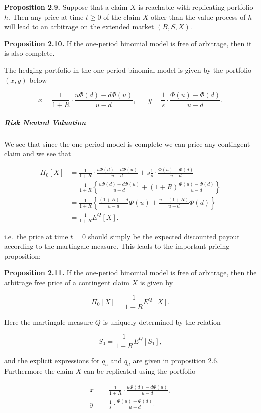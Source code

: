 \documentclass[
]{article}
\begin{document}
\textbf{Proposition 2.9.} Suppose that a claim \(X\) is reachable with
replicating portfolio \(h\). Then any price at time \(t\ge 0\) of the
claim \(X\) other than the value process of \(h\) will lead to an
arbitrage on the extended market \((B,S,X)\).

\textbf{Proposition 2.10.} If the one-period binomial model is free of
arbitrage, then it is also complete.

The hedging portfolio in the one-period binomial model is given by the
portfolio \((x,y)\) below

\[
x=\frac{1}{1+R}\cdot\frac{u\Phi(d)-d\Phi(u)}{u-d},\hspace{20pt}y=\frac{1}{s}\cdot\frac{\Phi(u)-\Phi(d)}{u-d}.
\]

\hypertarget{risk-neutral-valuation}{%
\subparagraph{Risk Neutral Valuation}\label{risk-neutral-valuation}}

We see that since the one-period model is complete we can price any
contingent claim and we see that

\begin{align*}
\Pi_0[X]&=\frac{1}{1+R}\cdot\frac{u\Phi(d)-d\Phi(u)}{u-d}+s\frac{1}{s}\cdot\frac{\Phi(u)-\Phi(d)}{u-d}\\
&=\frac{1}{1+R}\left\{\frac{u\Phi(d)-d\Phi(u)}{u-d}+(1+R)\frac{\Phi(u)-\Phi(d)}{u-d}\right\}\\
&=\frac{1}{1+R}\left\{\frac{(1+R)-d}{u-d}\Phi(u)+\frac{u-(1+R)}{u-d}\Phi(d)\right\}\\
&=\frac{1}{1+R}E^Q[X].
\end{align*}

i.e.~the price at time \(t=0\) should simply be the expected discounted
payout according to the martingale measure. This leads to the important
pricing proposition:

\textbf{Proposition 2.11.} If the one-period binomial model is free of
arbitrage, then the arbitrage free price of a contingent claim \(X\) is
given by

\[
\Pi_0[X]=\frac{1}{1+R}E^Q[X].\tag{2.4}
\]

Here the martingale measure \(Q\) is uniquely determined by the relation

\[
S_0=\frac{1}{1+R}E^Q[S_1],\tag{2.5}
\]

and the explicit expressions for \(q_u\) and \(q_d\) are given in
proposition 2.6. Furthermore the claim \(X\) can be replicated using the
portfolio

\begin{align*}
x&=\frac{1}{1+R}\cdot\frac{u\Phi(d)-d\Phi(u)}{u-d},\tag{2.6}\\
y&=\frac{1}{s}\cdot\frac{\Phi(u)-\Phi(d)}{u-d}.\tag{2.7}
\end{align*}
\end{document}
